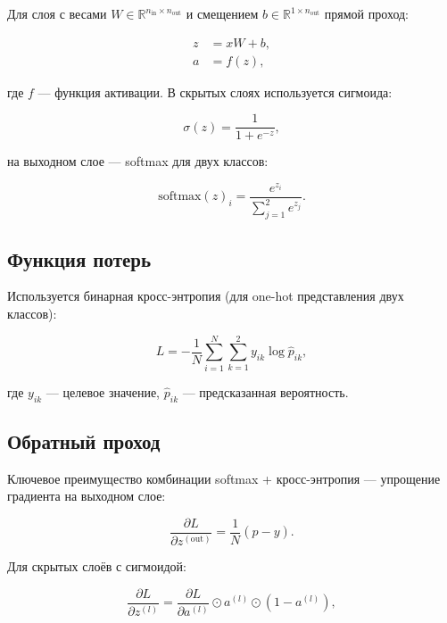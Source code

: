 \documentclass[12pt,a4paper]{article}
\begin{document}
Для слоя с весами $W \in \mathbb{R}^{n_{\text{in}} \times n_{\text{out}}}$
и смещением $b \in \mathbb{R}^{1 \times n_{\text{out}}}$ прямой проход:

\begin{align}
z &= x W + b, \\
a &= f(z),
\end{align}

где $f$ — функция активации. В скрытых слоях используется сигмоида:

\begin{equation}
\sigma(z) = \frac{1}{1 + e^{-z}},
\end{equation}

на выходном слое — softmax для двух классов:

\begin{equation}
\text{softmax}(z)_i = \frac{e^{z_i}}{\sum_{j=1}^{2} e^{z_j}}.
\end{equation}

\subsection{Функция потерь}

Используется бинарная кросс-энтропия (для one-hot представления двух классов):

\begin{equation}
L = -\frac{1}{N} \sum_{i=1}^{N} \sum_{k=1}^{2} y_{ik} \log \hat{p}_{ik},
\end{equation}

где $y_{ik}$ — целевое значение, $\hat{p}_{ik}$ — предсказанная вероятность.

\subsection{Обратный проход}

Ключевое преимущество комбинации softmax + кросс-энтропия — упрощение градиента
на выходном слое:

\begin{equation}
\frac{\partial L}{\partial z^{(\text{out})}} = \frac{1}{N} (\hat{p} - y).
\end{equation}

Для скрытых слоёв с сигмоидой:

\begin{equation}
\frac{\partial L}{\partial z^{(l)}}
= \frac{\partial L}{\partial a^{(l)}} \odot a^{(l)} \odot (1 - a^{(l)}),
\end{equation}
\end{document}
